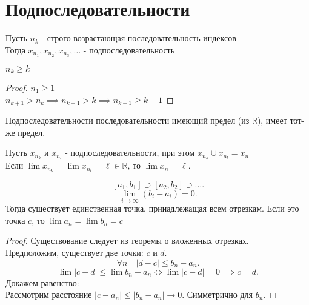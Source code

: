 \documentclass[11pt, oneside]{article}   	%
\begin{document}
\section{Подпоследовательности}
    \begin{definition}
        Пусть $n_k$ - строго возрастающая последовательность индексов\\
        Тогда $x_{n_1}, x_{n_2}, x_{n_3}, \ldots$ - подпоследовательность\\
    \end{definition}
    \begin{dlemma}
        $n_k \ge k$\\
        \begin{proof}
            $n_1 \ge 1$\\
            $n_{k+1} > n_k \implies n_{k+1} > k \implies n_{k+1} \ge k+1$
        \end{proof}
    \end{dlemma}
    \begin{dlemma}
        Подпоследовательности последовательности имеющий предел (из $\overline{\mathbb{R}}$), имеет тот-же предел.
    \end{dlemma}
    \begin{dlemma}
        Пусть $x_{n_k}$ и $x_{n_l}$ - подпоследовательности, при этом $x_{n_k} \cup x_{n_l} = x_n$ \\
        Если $\lim x_{n_k} = \lim x_{n_l} = \ell\in \overline{\mathbb{R}}$, то $\lim x_n = \ell$.
    \end{dlemma}
    \begin{theorem}
        \[ \left[a_1, b_1\right] \supset \left[a_2,b_2\right] \supset \ldots.\]
        \[ \lim\limits_{i \to \infty} (b_i - a_i) = 0 .\] 
        Тогда существует единственная точка, принадлежащая всем отрезкам. Если это точка $c$, то  $\lim a_n = \lim b_n = c$
         \begin{proof}
            Существование следует из теоремы о вложенных отрезках.\\
            Предположим, существует две точки: $c$ и  $d$.
             \[ \forall{n}\quad |d-c| \le b_n - a_n .\]
             \[ \lim |c-d| \le \lim b_n-a_n \iff \lim |c-d| = 0 \implies c=d .\] 
             Докажем равенство:\\
             Рассмотрим расстояние $|c-a_n| \le  |b_n-a_n| \to 0$. Симметрично для $b_n$.
        \end{proof}
    \end{theorem}
\end{document}
